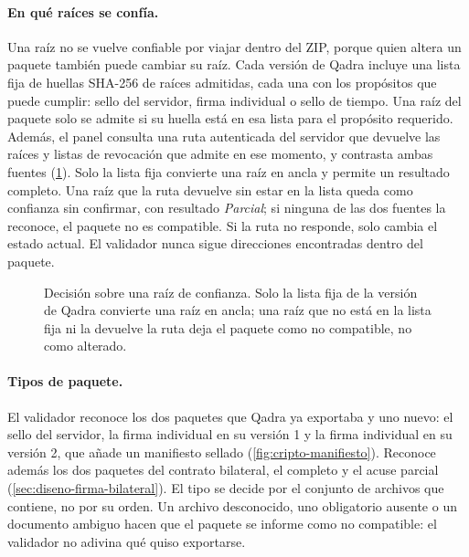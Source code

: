 \paragraph{En qué raíces se confía.} Una raíz no se vuelve confiable por viajar dentro del ZIP, porque quien altera un paquete también puede cambiar su raíz. Cada versión de Qadra incluye una lista fija de huellas SHA-256 de raíces admitidas, cada una con los propósitos que puede cumplir: sello del servidor, firma individual o sello de tiempo. Una raíz del paquete solo se admite si su huella está en esa lista para el propósito requerido. Además, el panel consulta una ruta autenticada del servidor que devuelve las raíces y listas de revocación que admite en ese momento, y contrasta ambas fuentes (\cref{fig:cripto-validador-raices}). Solo la lista fija convierte una raíz en ancla y permite un resultado completo. Una raíz que la ruta devuelve sin estar en la lista queda como confianza sin confirmar, con resultado \emph{Parcial}; si ninguna de las dos fuentes la reconoce, el paquete no es compatible. Si la ruta no responde, solo cambia el estado actual. El validador nunca sigue direcciones encontradas dentro del paquete.

\begin{figure}[!htbp]
  \centering
  
  \caption{Decisión sobre una raíz de confianza. Solo la lista fija de la versión de Qadra convierte una raíz en ancla; una raíz que no está en la lista fija ni la devuelve la ruta deja el paquete como no compatible, no como alterado.}
  \label{fig:cripto-validador-raices}
\end{figure}

\paragraph{Tipos de paquete.} El validador reconoce los dos paquetes que Qadra ya exportaba y uno nuevo: el sello del servidor, la firma individual en su versión 1 y la firma individual en su versión 2, que añade un manifiesto sellado (\cref{fig:cripto-manifiesto}). Reconoce además los dos paquetes del contrato bilateral, el completo y el acuse parcial (\cref{sec:diseno-firma-bilateral}). El tipo se decide por el conjunto de archivos que contiene, no por su orden. Un archivo desconocido, uno obligatorio ausente o un documento ambiguo hacen que el paquete se informe como no compatible: el validador no adivina qué quiso exportarse.

